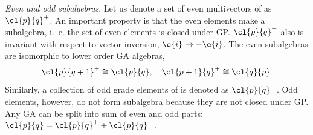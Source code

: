 %
\begin{unit}\label{evenoddalgebras}\textit{Even and odd subalgebras}.
Let us denote a set of even multivectors of  as $\cl{p}{q}^+$.
An important property is that the even elements make a subalgebra, i.~e. the set of 
even elements is closed under GP. $\cl{p}{q}^+$ also is invariant
with respect to vector inversion, $\e{i}\rightarrow -\e{i}$. The
even subalgebras are isomorphic to lower order GA
algebras,~\cite{Porteous04}%
\[\cl{p}{q+1}^+\cong\cl{p}{q},\quad\cl{p+1}{q}^+\cong\cl{q}{p}. \]
Similarly, a collection of odd grade elements of  is
denoted as $\cl{p}{q}^-$. Odd elements, however, do not form
subalgebra because they are not closed under GP. Any GA can be
split into sum of even and odd parts:
$\cl{p}{q}=\cl{p}{q}^{+}+\cl{p}{q}^-$.
\end{unit}
%
